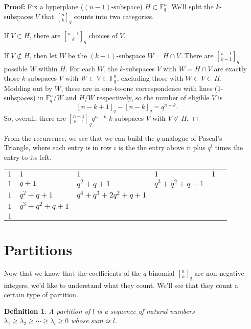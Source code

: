 \documentclass[11pt]{article}
\newtheorem{definition}[theorem]{Definition}
\newenvironment{proof}{\noindent \textbf{Proof:}}{$\Box$}
\newcommand{\F}{\mathbb F} %
\newcommand{\qbinom}[2] {{#1 \brack #2}_q}
\begin{document}
\begin{proof}
Fix a hyperplane ($(n-1)$-subspace) $H \subset \F_q^n$. We'll split the $k$-subspaces $V$ that $\qbinom{n}{k}$ counts into two categories.

If $V \subset H$, there are $\qbinom{n-1}{k}$ choices of $V$.

If $V \not \subset H$, then let $W$ be the $(k-1)$-subspace $W= H \cap V$. There are $\qbinom{n-1}{k-1}$ possible $W$ within $H$. For each $W$, the $k$-subspaces $V$ with $W = H \cap V$ are exactly those $k$-subspaces $V$ with $W\subset V \subset \F_q^n$, excluding those with $W\subset V \subset H$. Modding out by $W$, these are in one-to-one correspondence with lines ($1$-subspaces) in $\F_q^n / W$ and $H / W$ respectively, so the number of eligible $V$ is $$[n-k+1]_q - [n-k]_q=q^{n-k}.$$ So, overall, there are  $\qbinom{n-1}{k-1} q^{n-k}$ $k$-subspaces $V$ with $V \not \subset H$. 
\end{proof}

From the recurrence, we see that we can build the $q$-analogue of Pascal's Triangle, where each entry is in row $i$ is the the entry above it plus $q^i$ times the entry to its left.

\begin{center}
\begin{tabular}{ llllll } 
$1$ & $1$ & $1$ & $1$ & $1$ \\
$1$ & $q+1$ & $q^2+q+1$ & $q^3 + q^2+q+1$ & \\ 
$1$ & $q^2+q+1$ & $q^4+q^3+2q^2+q+1$ & & \\
$1$ & $q^3+q^2+q+1$ &&& \\
$1$ &&&& \\
\end{tabular}
\end{center}

\section{Partitions}

Now that we know that the coefficients of the $q$-binomial $\qbinom{n}{k}$ are non-negative integers, we'd like to understand what they count. We'll see that they count a certain type of partition. 

\begin{definition}
A \emph{partition} of $l$ is a sequence of natural numbers $\lambda_1 \geq \lambda_2 \geq \cdots \geq \lambda_l \geq 0$ whose sum is $l$. 
\end{definition}
\end{document}

